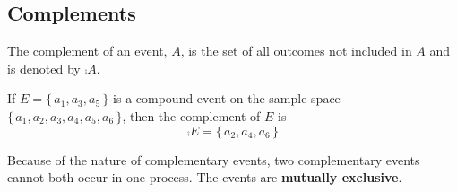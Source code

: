 \subsection*{Complements}
The complement of an event, $A$, is the set of all outcomes not included in $A$ and is denoted by $\comp{A}$.
\begin{example}
If $E = \{\, a_1, a_3, a_5 \,\}$ is a compound event on the sample space $\{\, a_1, a_2, a_3,a_4,a_5,a_6 \,\}$, then the complement of $E$ is
\[
    \comp{E}=\{\, a_2,a_4,a_6 \,\}
\]
\end{example}
\begin{info}
Because of the nature of complementary events, two complementary events cannot both occur in one process. The events are \textbf{mutually exclusive}.
\end{info}
